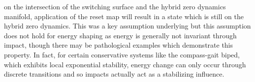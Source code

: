 \documentclass[english]{article}
\begin{document}
on the intersection of the switching surface and the hybrid zero dynamics
manifold, application of the reset map will result in a state which is still on
the hybrid zero dynamics.
%
This was a key assumption underlying \cite{Ames2014} but this assumption does
not hold for energy shaping as energy is generally not invariant through impact,
though there may be pathological examples which demonstrate this property.
%
In fact, for certain conservative systems like the compass-gait biped, which
exhibits local exponential stability, energy change can only occur through
discrete transitions and so impacts actually act as a stabilizing influence.
%
%
%
\end{document}

